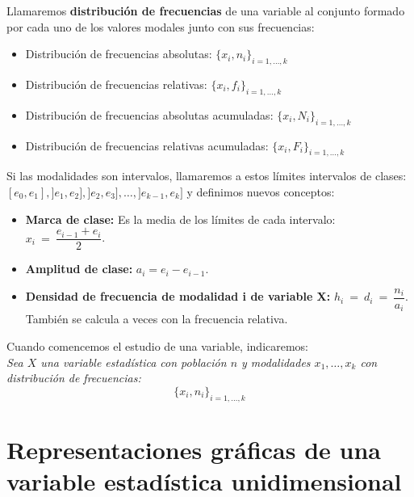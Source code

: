 Llamaremos \textbf{distribución de frecuencias} de una variable al conjunto formado por cada uno de los valores modales junto con sus frecuencias:
\begin{itemize}
    \item Distribución de frecuencias absolutas: $\{x_i, n_i\}_{i=1, \dots, k}$
    \item Distribución de frecuencias relativas: $\{x_i, f_i\}_{i=1, \dots, k}$
    \item Distribución de frecuencias absolutas acumuladas: $\{x_i, N_i\}_{i=1, \dots, k}$
    \item Distribución de frecuencias relativas acumuladas: $\{x_i, F_i\}_{i=1, \dots, k}$
\end{itemize}


Si las modalidades son intervalos, llamaremos a estos límites intervalos de clases: $[e_{0}, e_{1}], ]e_{1}, e_{2}], ]e_{2}, e_{3}], \ldots, ]e_{k-1}, e_{k}]$ y definimos nuevos conceptos:
\begin{itemize}
    \item \textbf{Marca de clase:} Es la media de los límites de cada intervalo: $x_{i}~=~\dfrac{e_{i-1}+e_{i}}{2}$.
    \item \textbf{Amplitud de clase:} $a_{i} = e_{i} - e_{i-1}$.
    \item \textbf{Densidad de frecuencia de modalidad i de variable X:} $h_{i}~=~d_{i}~=~\dfrac{n_{i}}{a_{i}}$. También se calcula a veces con la frecuencia relativa.
\end{itemize}


Cuando comencemos el estudio de una variable, indicaremos:\\
\emph{
    Sea $X$ una variable estadística con población $n$ y modalidades $x_1, \dots, x_k$ con \emph{distribución de frecuencias}:
        $$\{x_i, n_i\}_{i=1, \dots, k}$$
}

\section{Representaciones gráficas de una variable estadística unidimensional}


